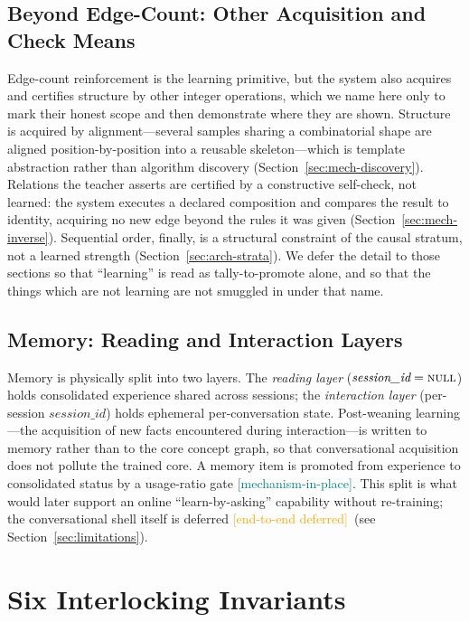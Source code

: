 \documentclass[11pt,a4paper]{article}
\newcommand{\statusmech}{\textcolor{teal}{\small\textsf{[mechanism-in-place]}}}
\newcommand{\statusdeferred}{\textcolor{orange}{\small\textsf{[end-to-end deferred]}}}
\begin{document}
\subsection{Beyond Edge-Count: Other Acquisition and Check Means}
\label{sec:arch-learning-other}

Edge-count reinforcement is the learning primitive, but the system also
acquires and certifies structure by other integer operations, which we
name here only to mark their honest scope and then demonstrate where they
are shown. Structure is acquired by alignment---several samples sharing a
combinatorial shape are aligned position-by-position into a reusable
skeleton---which is template abstraction rather than algorithm discovery
(Section~\ref{sec:mech-discovery}). Relations the teacher asserts are
certified by a constructive self-check, not learned: the system executes
a declared composition and compares the result to identity, acquiring no
new edge beyond the rules it was given
(Section~\ref{sec:mech-inverse}). Sequential order, finally, is a
structural constraint of the causal stratum, not a learned strength
(Section~\ref{sec:arch-strata}). We defer the detail to those sections so
that ``learning'' is read as tally-to-promote alone, and so that the
things which are not learning are not smuggled in under that name.

\subsection{Memory: Reading and Interaction Layers}
\label{sec:arch-memory}

Memory is physically split into two layers. The \emph{reading layer}
($\textit{session\_id} = \textsc{null}$) holds consolidated experience
shared across sessions; the \emph{interaction layer} (per-session
$\textit{session\_id}$) holds ephemeral per-conversation state.
Post-weaning learning---the acquisition of new facts encountered during
interaction---is written to memory rather than to the core concept graph,
so that conversational acquisition does not pollute the trained core.
A memory item is promoted from experience to consolidated status by a
usage-ratio gate \statusmech. This split is what would later support an
online ``learn-by-asking'' capability without re-training; the
conversational shell itself is deferred \statusdeferred\ (see
Section~\ref{sec:limitations}).

\section{Six Interlocking Invariants}
\label{sec:invariants}
\end{document}
